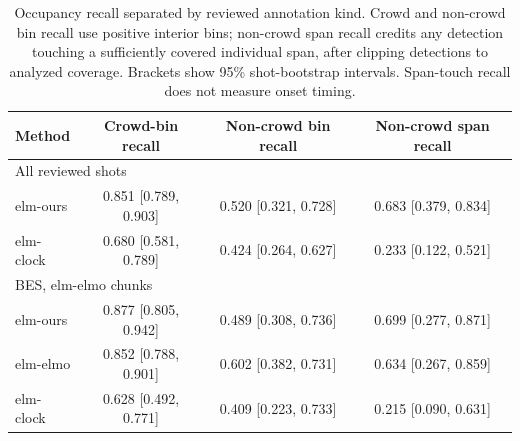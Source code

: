 \begin{table}[t]
\centering
\small
\begin{tabular}{lccc}
\toprule
Method & Crowd-bin recall & Non-crowd bin recall & Non-crowd span recall \\
\midrule
\multicolumn{4}{l}{All reviewed shots} \\
elm-ours & 0.851 {\scriptsize[0.789, 0.903]} & 0.520 {\scriptsize[0.321, 0.728]} & 0.683 {\scriptsize[0.379, 0.834]} \\
elm-clock & 0.680 {\scriptsize[0.581, 0.789]} & 0.424 {\scriptsize[0.264, 0.627]} & 0.233 {\scriptsize[0.122, 0.521]} \\
\midrule
\multicolumn{4}{l}{BES, elm-elmo chunks} \\
elm-ours & 0.877 {\scriptsize[0.805, 0.942]} & 0.489 {\scriptsize[0.308, 0.736]} & 0.699 {\scriptsize[0.277, 0.871]} \\
elm-elmo & 0.852 {\scriptsize[0.788, 0.901]} & 0.602 {\scriptsize[0.382, 0.731]} & 0.634 {\scriptsize[0.267, 0.859]} \\
elm-clock & 0.628 {\scriptsize[0.492, 0.771]} & 0.409 {\scriptsize[0.223, 0.733]} & 0.215 {\scriptsize[0.090, 0.631]} \\
\bottomrule
\end{tabular}\caption{Occupancy recall separated by reviewed annotation kind. Crowd and non-crowd bin recall use positive interior bins; non-crowd span recall credits any detection touching a sufficiently covered individual span, after clipping detections to analyzed coverage. Brackets show 95\% shot-bootstrap intervals. Span-touch recall does not measure onset timing.}
\label{tab:elm-per-kind}
\end{table}
